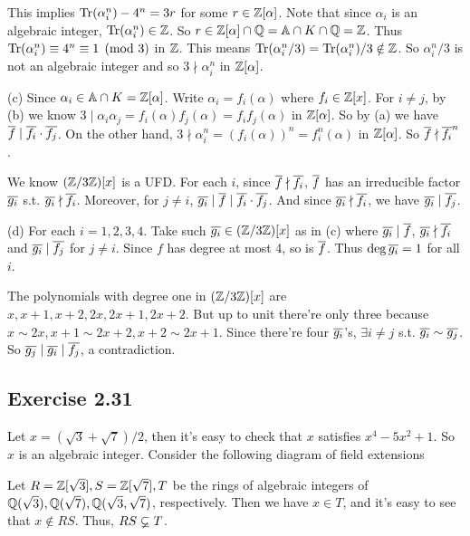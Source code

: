 \documentclass[../Marcus.tex]{subfiles}
\begin{document}
This implies $\operatorname{Tr}(\alpha_i^n)-4^n=3r$ for some $r\in\mathbb{Z}[\alpha]$. Note that since $\alpha_i$ is an algebraic integer, $\operatorname{Tr}(\alpha_i^n)\in\mathbb{Z}$. So $r\in\mathbb{Z}[\alpha]\cap\mathbb{Q}=\mathbb{A}\cap K\cap\mathbb{Q}=\mathbb{Z}$. Thus $\operatorname{Tr}(\alpha_i^n)\equiv4^n \equiv 1\pmod{3}$ in $\mathbb{Z}$. This means $\operatorname{Tr}(\alpha_i^n/3)=\operatorname{Tr}(\alpha_i^n)/3\notin\mathbb{Z}$. So $\alpha_i^n/3$ is not an algebraic integer and so $3\nmid \alpha_i^n$ in $\mathbb{Z}[\alpha]$.

(c) Since $\alpha_i\in\mathbb{A}\cap K=\mathbb{Z}[\alpha]$. Write $\alpha_i=f_i(\alpha)$ where $f_i\in\mathbb{Z}[x]$. For $i\neq j$, by (b) we know $3\mid \alpha_i\alpha_j=f_i(\alpha)f_j(\alpha)=f_if_j(\alpha)$ in $\mathbb{Z}[\alpha]$. So by (a) we have $\overline{f}\mid\overline{f_i}\cdot\overline{f_j}$. On the other hand, $3\nmid \alpha_i^n=(f_i(\alpha))^n=f_i^n(\alpha)$ in $\mathbb{Z}[\alpha]$. So $\overline{f}\nmid\overline{f_i}^n$.

We know $(\mathbb{Z}/3\mathbb{Z})[x]$ is a UFD. For each $i$, since $\overline{f}\nmid\overline{f_i}$, $\overline{f}$ has an irreducible factor $\overline{g_i}$ s.t. $\overline{g_i}\nmid\overline{f_i}$. Moreover, for $j\neq i$, $\overline{g_i}\mid\overline{f}\mid\overline{f_i}\cdot\overline{f_j}$. And since $\overline{g_i}\nmid\overline{f_i}$, we have $\overline{g_i}\mid\overline{f_j}$.

(d) For each $i=1,2,3,4$. Take such $\overline{g_i}\in(\mathbb{Z}/3\mathbb{Z})[x]$ as in (c) where $\overline{g_i}\mid\overline{f}$, $\overline{g_i}\nmid\overline{f_i}$ and $\overline{g_i}\mid\overline{f_j}$ for $j\neq i$. Since $f$ has degree at most 4, so is $\overline{f}$. Thus $\deg\overline{g_i}=1$ for all $i$.

The polynomials with degree one in $(\mathbb{Z}/3\mathbb{Z})[x]$ are $x,x+1,x+2,2x,2x+1,2x+2$. But up to unit there're only three because $x\sim2x,x+1\sim2x+2,x+2\sim2x+1$. Since there're four $\overline{g_i}$'s, $\exists i\neq j$ s.t. $\overline{g_i}\sim \overline{g_j}$. So $\overline{g_j}\mid\overline{g_i}\mid\overline{f_j}$, a contradiction. 

\subsection*{Exercise 2.31}

Let $x=(\sqrt{3}+\sqrt{7})/2$, then it's easy to check that $x$ satisfies $x^4-5x^2+1$. So $x$ is an algebraic integer. Consider the following diagram of field extensions
\begin{center}
\end{center}
Let $R=\mathbb{Z}[\sqrt{3}],S=\mathbb{Z}[\sqrt{7}],T$ be the rings of algebraic integers of $\mathbb{Q}(\sqrt{3}),\mathbb{Q}(\sqrt{7}),\mathbb{Q}(\sqrt{3},\sqrt{7})$, respectively. Then we have $x\in T$, and it's easy to see that $x\notin RS$. Thus, $RS\varsubsetneq T$. 
\end{document}
